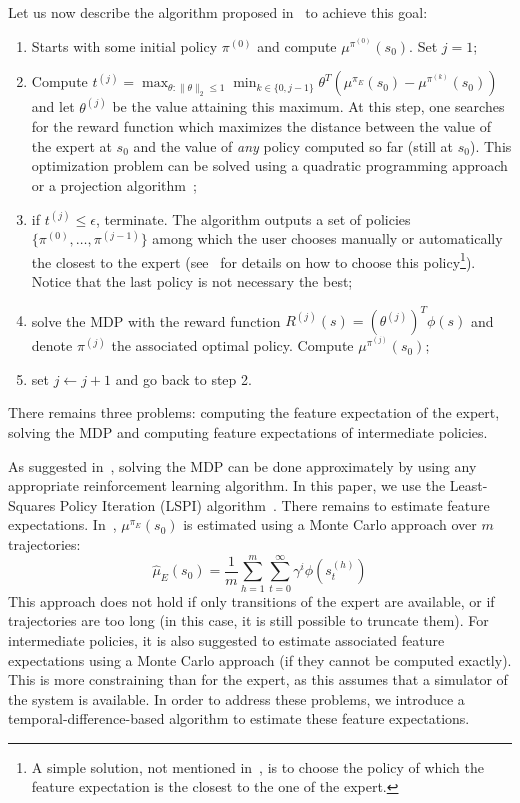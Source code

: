 \documentclass{jfpda2011}
\begin{document}
Let us now describe the algorithm proposed in~\citep{abbeel2004apprenticeship} to
achieve this goal:
\begin{enumerate}
  \item Starts with some initial policy $\pi^{(0)}$ and compute
  $\mu^{\pi^{(0)}}(s_0)$. Set $j=1$;
  \item Compute $t^{(j)} = \max_{\theta: \|\theta\|_2\leq 1}
  \min_{k\in\{0,j-1\}}\theta^T(\mu^{\pi_E}(s_0) -
  \mu^{\pi^{(k)}}(s_0))$ and let $\theta^{(j)}$ be the value
  attaining this maximum. At this step, one searches for the reward
  function which maximizes the distance between the value of the
  expert at $s_0$ and the value of \emph{any} policy computed so far
  (still at $s_0$). This optimization problem can be solved using a
  quadratic programming approach or a projection
  algorithm~\citep{abbeel2004apprenticeship};
  \item if $t^{(j)}\leq \epsilon$, terminate. The algorithm outputs a
  set of policies $\{\pi^{(0)}, \dots, \pi^{(j-1)}\}$ among which
  the user chooses manually or automatically the closest to the
  expert (see~\citep{abbeel2004apprenticeship} for details on how to choose this
  policy\footnote{A simple solution, not mentioned in~\citep{abbeel2004apprenticeship},
  is to choose the policy of which the feature expectation is the
  closest to the one of the expert.}).
  Notice that the last policy is not necessary the best;
  \item solve the MDP with the reward function $R^{(j)}(s) =
  (\theta^{(j)})^T\phi(s)$ and denote $\pi^{(j)}$ the associated
  optimal policy. Compute $\mu^{\pi^{(j)}}(s_0)$;
  \item set $j\leftarrow j+1$ and go back to step 2.
\end{enumerate}
There remains three problems: computing the feature expectation of
the expert, solving the MDP and computing feature expectations of
intermediate policies.

As suggested in~\citep{abbeel2004apprenticeship}, solving the MDP can be done
approximately by using any appropriate reinforcement learning
algorithm. In this paper, we use the Least-Squares Policy Iteration
(LSPI) algorithm~\citep{lagoudakis2003least}. There remains to estimate
feature expectations. In~\citep{abbeel2004apprenticeship}, $\mu^{\pi_E}(s_0)$ is
estimated using a Monte Carlo approach over $m$ trajectories:
\begin{equation}
  \hat{\mu}_E(s_0) = \frac{1}{m} \sum_{h=1}^m \sum_{t=0}^\infty
  \gamma^i \phi(s_t^{(h)})
\end{equation}
This approach does not hold if only transitions of the expert are
available, or if trajectories are too long (in this case, it is
still possible to truncate them). For intermediate policies, it is
also suggested to estimate associated feature expectations using a
Monte Carlo approach (if they cannot be computed exactly). This is
more constraining than for the expert, as this assumes that a
simulator of the system is available. In order to address these
problems, we introduce a temporal-difference-based algorithm to
estimate these feature expectations.
\end{document}
